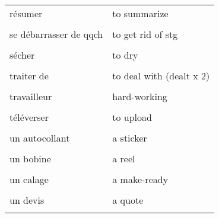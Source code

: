 \documentclass[
  10pt,
]{article}
\begin{document}
\begin{longtable}{ll}
résumer & to summarize\\

\cellcolor{gray!6}{s'intéresser à qqch} & \cellcolor{gray!6}{to be interested in stg}\\

se débarrasser de qqch & to get rid of stg\\

\cellcolor{gray!6}{suivant} & \cellcolor{gray!6}{next}\\

sécher & to dry\\

\cellcolor{gray!6}{tard/en retard} & \cellcolor{gray!6}{late}\\

traiter de & to deal with (dealt x 2)\\

\cellcolor{gray!6}{traiter une commande} & \cellcolor{gray!6}{to run an order}\\

travailleur & hard-working\\

\cellcolor{gray!6}{télécharger} & \cellcolor{gray!6}{to download}\\

téléverser & to upload\\

\cellcolor{gray!6}{un appareil électronique} & \cellcolor{gray!6}{a device}\\

un autocollant & a sticker\\

\cellcolor{gray!6}{un blanchet} & \cellcolor{gray!6}{un blanket}\\

un bobine & a reel\\

\cellcolor{gray!6}{un bâtonnet (yeux)} & \cellcolor{gray!6}{a rod}\\

un calage & a make-ready\\

\cellcolor{gray!6}{un client} & \cellcolor{gray!6}{a customer}\\

un devis & a quote\\

\cellcolor{gray!6}{un dépliant} & \cellcolor{gray!6}{a folded leaflet}\\


\end{longtable}
\end{document}
